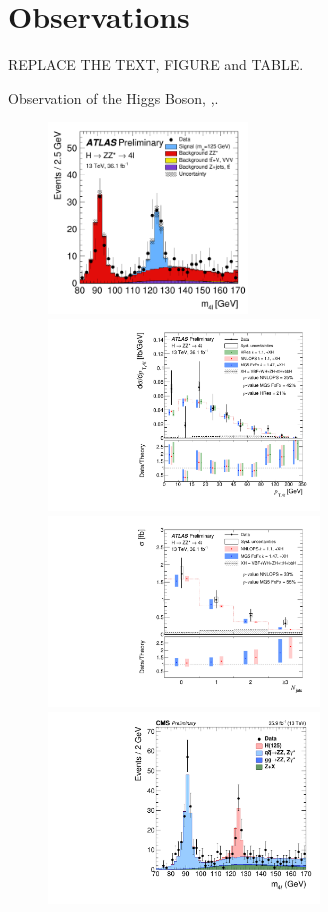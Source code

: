 \documentclass[10pt]{article}
\begin{document}
\section{Observations}

REPLACE THE TEXT, FIGURE and TABLE.

Observation of the Higgs Boson,  \cite{Aad:2012tfa},\cite{Chatrchyan:2012ufa}. 

 
\begin{figure}[htb]
\centering
\includegraphics[height=2in]{figures/ATLAS-CONF-2017-032__fig_01__m4l.pdf}
\includegraphics[height=2in]{figures/ATLAS-CONF-2017-032__fig_08a__pT4l.pdf}
\includegraphics[height=2in]{figures/ATLAS-CONF-2017-032__fig_09a__njets.pdf}\\
\includegraphics[height=2in]{figures/CMS-HIG-16-041__Figure_003-b__m4l.pdf}

\end{figure}
\end{document}
